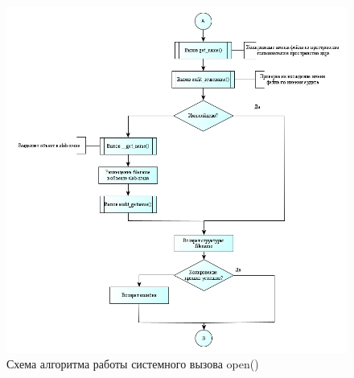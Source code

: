 \begin{figure}[h!]
	\caption{Схема алгоритма работы системного вызова open()}
	\center\includegraphics[scale=0.65]{img/2.jpg}
	
\end{figure}

